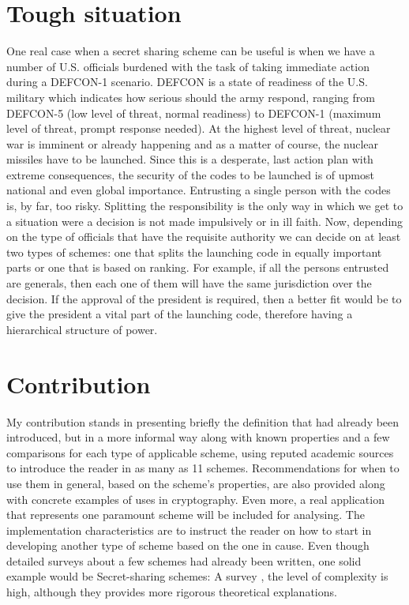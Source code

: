 \documentclass[12pt, a4paper, oneside]{book}
\begin{document}
    \section{Tough situation}
    One real case when a secret sharing scheme can be useful is when we have a number of U.S. officials burdened with the task of taking immediate action during a DEFCON-1 scenario. DEFCON is a state of readiness of the U.S. military which indicates how serious should the army respond, ranging from DEFCON-5 (low level of threat, normal readiness) to DEFCON-1 (maximum level of threat, prompt response needed). At the highest level of threat, nuclear war is imminent or already happening and as a matter of course, the nuclear missiles have to be launched. Since this is a desperate, last action plan with extreme consequences, the security of the codes to be launched is of upmost national and even global importance. Entrusting a single person with the codes is, by far, too risky. Splitting the responsibility is the only way in which we get to a situation were a decision is not made impulsively or in ill faith. Now, depending on the type of officials that have the requisite authority we can decide on at least two types of schemes: one that splits the launching code in equally important parts or one that is based on ranking. For example, if all the persons entrusted are generals, then each one of them will have the same jurisdiction over the decision. If the approval of the president is required, then a better fit would be to give the president a vital part of the launching code, therefore having a hierarchical structure of power.
    \\
    \section{Contribution} My contribution stands in presenting briefly the definition that had already been introduced, but in a more informal way along with known properties and a few comparisons for each type of applicable scheme, using reputed academic sources to introduce the reader in as many as 11 schemes. Recommendations for when to use them in general, based on the scheme's properties, are also provided along with concrete examples of uses in cryptography. Even more, a real application that represents one paramount scheme will be included for analysing. The implementation characteristics are to instruct the reader on how to start in developing another type of scheme based on the one in cause. Even though detailed surveys about a few schemes had already been written, one solid example would be Secret-sharing schemes: A survey \cite{SecretSurveyB}, the level of complexity is high, although they provides more rigorous theoretical explanations. 
    \\
\end{document}

